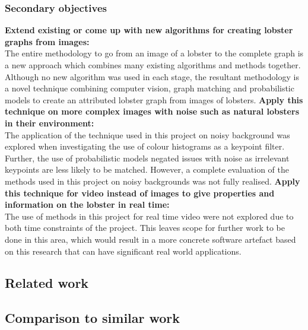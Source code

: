\subsubsection{Secondary objectives}
\textbf{Extend existing or come up with new algorithms for creating lobster graphs from images:} \\
The entire methodology to go from an image of a lobster to the complete graph is a new approach which combines many existing algorithms and methods together. Although no new algorithm was used in each stage, the resultant methodology is a novel technique combining computer vision, graph matching and probabilistic models to create an attributed lobster graph from images of lobsters.
\n
\textbf{Apply this technique on more complex images with noise such as natural lobsters in their environment:} \\
The application of the technique used in this project on noisy background was explored when investigating the use of colour histograms as a keypoint filter. Further, the use of probabilistic models negated issues with noise as irrelevant keypoints are less likely to be matched. However, a complete evaluation of the methods used in this project on noisy backgrounds was not fully realised. 
\n
\textbf{Apply this technique for video instead of images to give properties and information on the lobster in real time:} \\
The use of methods in this project for real time video were not explored due to both time constraints of the project. This leaves scope for further work to be done in this area, which would result in a more concrete software artefact based on this research that can have significant real world applications.  

\subsection{Related work}

\subsection{Comparison to similar work}